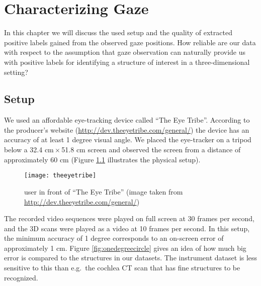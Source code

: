 \chapter{Characterizing Gaze}
\label{chap:characterizing-gaze}
In this chapter we will discuss the used setup and the quality of extracted positive labels gained from the observed gaze positions. How reliable are our data with respect to the assumption that gaze observation can naturally provide us with positive labels for identifying a structure of interest in a three-dimensional setting?

\section{Setup}
We used an affordable eye-tracking device called ``The Eye Tribe''. 
According to the producer's website (\url{http://dev.theeyetribe.com/general/}) the device has an accuracy of at least 1 degree visual angle. We placed the eye-tracker on a tripod below a 32.4 cm\,$\times$\,51.8 cm screen and observed the screen from a distance of approximately 60 cm (Figure \ref{fig:theeyetribe} illustrates the physical setup).

\begin{figure}[ht]
	\centering
	\texttt{[image: theeyetribe]}	
	\caption{user in front of ``The Eye Tribe'' (image taken from \url{http://dev.theeyetribe.com/general/})}
	\label{fig:theeyetribe}
\end{figure}

The recorded video sequences were played on full screen at 30 frames per second, and the 3D scans were played as a video at 10 frames per second. 
In this setup, the minimum accuracy of 1 degree corresponds to an on-screen error of approximately 1 cm. 
Figure \ref{fig:onedegreecircle} gives an idea of how much big error is compared to the structures in our datasets. 
The instrument dataset is less sensitive to this than e.g.\ the cochlea CT scan that has fine structures to be recognized.

